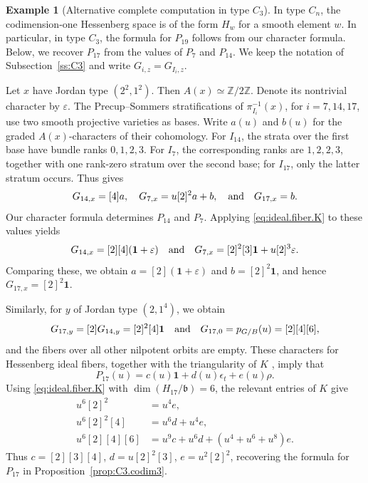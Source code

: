 \documentclass[11pt]{amsart}
\numberwithin{equation}{section}
\theoremstyle{definition}
\newtheorem{example}[theorem]{Example}
\def\and{\quad{\rm and}\quad}
\def\fb{\mathfrak {b}}
\begin{document}
\begin{example}[Alternative complete computation in type $C_3$]
\label{ex:C3.ideal}
In type $C_n$, the codimension-one Hessenberg space is of the form $H_w$ for a smooth element $w$. 
In particular, in type $C_3$, the formula for $P_{19}$ follows from our character formula.
Below, we recover $P_{17}$ from the values of $P_7$ and $P_{14}$.
We keep the notation of Subsection~\ref{ss:C3} and write $G_{i,z}=G_{I_i,z}$.

Let $x$ have Jordan type $(2^2,1^2)$.
Then $A(x)\simeq\mathbb Z/2\mathbb Z$.
Denote its nontrivial character by $\varepsilon$.
The Precup--Sommers stratifications of $\pi_{I_i}^{-1}(x)$, for $i=7,14,17$, use two smooth projective varieties as bases.
Write $a(u)$ and $b(u)$ for the graded $A(x)$-characters of their cohomology.
For $I_{14}$, the strata over the first base have bundle ranks $0,1,2,3$.
For $I_7$, the corresponding ranks are $1,2,2,3$, together with one rank-zero stratum over the second base; for $I_{17}$, only the latter stratum occurs.
Thus \cite[(3.5) and Corollary~3.8]{PS} gives
\[
G_{14,x}=[4]a,\quad
G_{7,x}=u[2]^2a+b,\and
G_{17,x}=b.
\]
Our character formula determines $P_{14}$ and $P_7$.
Applying \eqref{eq:ideal.fiber.K} to these values yields
\[
G_{14,x}=[2][4](\mathbf1+\varepsilon)
\and
G_{7,x}=[2]^2[3]\mathbf1+u[2]^3\varepsilon.
\]
Comparing these, we obtain $a=[2](\mathbf1+\varepsilon)$ and $b=[2]^2\mathbf1$, and hence $G_{17,x}=[2]^2\mathbf1$.

Similarly, for $y$ of Jordan type $(2,1^4)$, we obtain
\[
G_{17,y}=[2]G_{14,y}=[2]^2[4]\mathbf1 \and G_{17,0}=p_{G/B}(u)=[2][4][6],
\]
and the fibers over all other nilpotent orbits are empty.
These characters for Hessenberg ideal fibers, together with the triangularity of $K$ \cite[Section~4]{PS}, imply that
\[
P_{17}(u)=c(u)\mathbf1+d(u)\epsilon_t+e(u)\rho.
\]
Using \eqref{eq:ideal.fiber.K} with $\dim(H_{17}/\fb)=6$,
the relevant entries of $K$ give
\[
\begin{aligned}
u^6[2]^2&=u^4e,\\
u^6[2]^2[4]&=u^6d+u^4e,\\
u^6[2][4][6]&=u^9c+u^6d+(u^4+u^6+u^8)e.
\end{aligned}
\]
Thus $c=[2][3][4]$, $d=u[2]^2[3]$, $e=u^2[2]^2$,  recovering the formula for $P_{17}$ in Proposition~\ref{prop:C3.codim3}.
\end{example}
\end{document}
